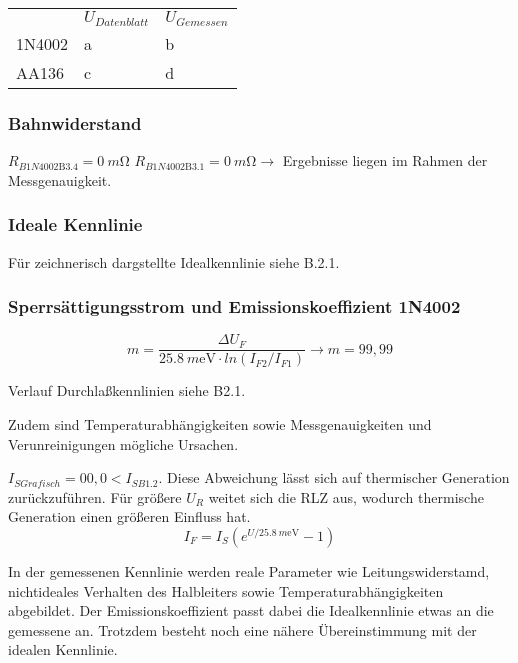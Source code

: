 \documentclass[
	a4paper, %
	12pt, %
]{CSUniSchoolLabReport}
\newcommand{\milli}{m}
\begin{document}
\begin{table}[]
\centering
\begin{tabular}{@{}ll|l@{}}
                            & $U_{Datenblatt}$ & $U_{Gemessen}$ \\
\cmidrule(l){2-3}
\multicolumn{1}{l|}{1N4002} & a                & b              \\
\midrule
\multicolumn{1}{l|}{AA136}  & c                & d             
\end{tabular}
\end{table}


\subsubsection{Bahnwiderstand}
$R_{B1N4002\text{B3.4}} = \SI{0}{\milli\ohm}$ $R_{B1N4002\text{B3.1}} = \SI{0}{\milli\ohm}\rightarrow $ Ergebnisse liegen im Rahmen der Messgenauigkeit. 
\subsubsection{Ideale Kennlinie}
Für zeichnerisch dargstellte Idealkennlinie siehe B.2.1.
\subsubsection{Sperrsättigungsstrom und Emissionskoeffizient 1N4002}
\vspace{1em} 
\[
m = \frac{\Delta U_F}{\SI{25.8}{\milli\electronvolt}\cdot ln(I_{F2}/I_{F1})} \rightarrow m = 99,99
\]
\vspace{1em}

Verlauf Durchlaßkennlinien siehe B2.1. 



Zudem sind Temperaturabhängigkeiten sowie Messgenauigkeiten und Verunreinigungen mögliche Ursachen. 

$I_{S Grafisch} = 00,0 < I_{S B1.2}$. Diese Abweichung lässt sich auf thermischer Generation zurückzuführen. Für größere $U_R$ weitet sich die RLZ aus, wodurch thermische Generation einen größeren Einfluss hat. 
\[
I_F = I_S(e^{U/\SI{25.8}{\milli\electronvolt}}-1)
\]

In der gemessenen Kennlinie werden reale Parameter wie Leitungswiderstamd, nichtideales Verhalten des Halbleiters sowie Temperaturabhängigkeiten abgebildet.
Der Emissionskoeffizient passt dabei die Idealkennlinie etwas an die gemessene an. Trotzdem besteht noch eine nähere Übereinstimmung mit der idealen Kennlinie.
\end{document}
